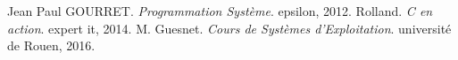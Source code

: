 \begin{thebibliography}{ABC}	
     Jean Paul GOURRET. \emph{Programmation Système}. epsilon, 2012.
     Rolland. \emph{C en action}. expert it, 2014.
     M. Guesnet. \emph{Cours de Systèmes d'Exploitation}. université de Rouen, 2016.
\end{thebibliography}
